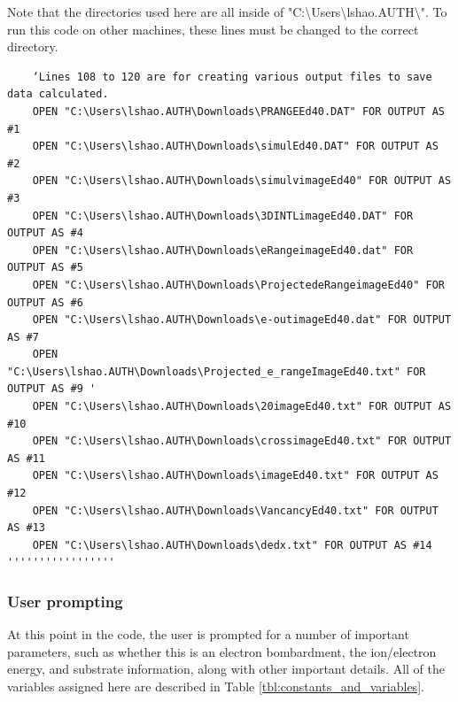 \documentclass[10pt, reqno]{exam}
\begin{document}
{Note that the directories used here are all inside of "C:\textbackslash Users\textbackslash lshao.AUTH\textbackslash ". To run this code on other machines, these lines must be changed to the correct directory.

\begin{verbatim}
    ‘Lines 108 to 120 are for creating various output files to save data calculated. 
    OPEN "C:\Users\lshao.AUTH\Downloads\PRANGEEd40.DAT" FOR OUTPUT AS #1
    OPEN "C:\Users\lshao.AUTH\Downloads\simulEd40.DAT" FOR OUTPUT AS #2
    OPEN "C:\Users\lshao.AUTH\Downloads\simulvimageEd40" FOR OUTPUT AS #3
    OPEN "C:\Users\lshao.AUTH\Downloads\3DINTLimageEd40.DAT" FOR OUTPUT AS #4
    OPEN "C:\Users\lshao.AUTH\Downloads\eRangeimageEd40.dat" FOR OUTPUT AS #5
    OPEN "C:\Users\lshao.AUTH\Downloads\ProjectedeRangeimageEd40" FOR OUTPUT AS #6
    OPEN "C:\Users\lshao.AUTH\Downloads\e-outimageEd40.dat" FOR OUTPUT AS #7
    OPEN "C:\Users\lshao.AUTH\Downloads\Projected_e_rangeImageEd40.txt" FOR OUTPUT AS #9 '
    OPEN "C:\Users\lshao.AUTH\Downloads\20imageEd40.txt" FOR OUTPUT AS #10
    OPEN "C:\Users\lshao.AUTH\Downloads\crossimageEd40.txt" FOR OUTPUT AS #11
    OPEN "C:\Users\lshao.AUTH\Downloads\imageEd40.txt" FOR OUTPUT AS #12
    OPEN "C:\Users\lshao.AUTH\Downloads\VancancyEd40.txt" FOR OUTPUT AS #13
    OPEN "C:\Users\lshao.AUTH\Downloads\dedx.txt" FOR OUTPUT AS #14 '''''''''''''''''
\end{verbatim}
}
\subsubsection{User prompting}

At this point in the code, the user is prompted for a number of important parameters, such as whether this is an electron bombardment, the ion/electron energy, and substrate information, along with other important details. All of the variables assigned here are described in Table \ref{tbl:constants_and_variables}.
\end{document}
